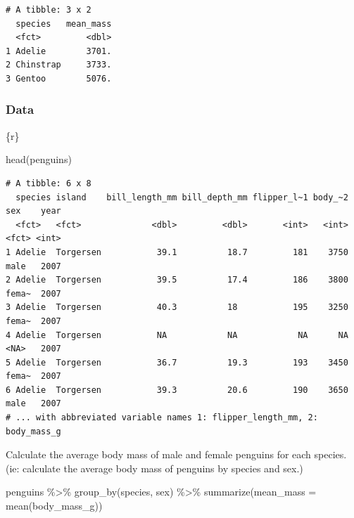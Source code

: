 \documentclass[
  letterpaper,
  DIV=11,
  numbers=noendperiod]{scrreprt}
\newenvironment{Shaded}{\begin{snugshade}}{\end{snugshade}}
\newcommand{\AttributeTok}[1]{\textcolor[rgb]{0.40,0.45,0.13}{#1}}
\newcommand{\FunctionTok}[1]{\textcolor[rgb]{0.28,0.35,0.67}{#1}}
\newcommand{\InformationTok}[1]{\textcolor[rgb]{0.37,0.37,0.37}{#1}}
\newcommand{\NormalTok}[1]{\textcolor[rgb]{0.00,0.23,0.31}{#1}}
\newcommand{\SpecialCharTok}[1]{\textcolor[rgb]{0.37,0.37,0.37}{#1}}
\begin{document}
\begin{verbatim}
# A tibble: 3 x 2
  species   mean_mass
  <fct>         <dbl>
1 Adelie        3701.
2 Chinstrap     3733.
3 Gentoo        5076.
\end{verbatim}

\hypertarget{data-5}{%
\subsubsection*{Data}\label{data-5}}

\begin{Shaded}
\begin{Highlighting}[]
\InformationTok{\textasciigrave{}\textasciigrave{}\textasciigrave{}\{r\}}

\FunctionTok{head}\NormalTok{(penguins)}
\InformationTok{\textasciigrave{}\textasciigrave{}\textasciigrave{}}
\end{Highlighting}
\end{Shaded}

\begin{verbatim}
# A tibble: 6 x 8
  species island    bill_length_mm bill_depth_mm flipper_l~1 body_~2 sex    year
  <fct>   <fct>              <dbl>         <dbl>       <int>   <int> <fct> <int>
1 Adelie  Torgersen           39.1          18.7         181    3750 male   2007
2 Adelie  Torgersen           39.5          17.4         186    3800 fema~  2007
3 Adelie  Torgersen           40.3          18           195    3250 fema~  2007
4 Adelie  Torgersen           NA            NA            NA      NA <NA>   2007
5 Adelie  Torgersen           36.7          19.3         193    3450 fema~  2007
6 Adelie  Torgersen           39.3          20.6         190    3650 male   2007
# ... with abbreviated variable names 1: flipper_length_mm, 2: body_mass_g
\end{verbatim}

Calculate the average body mass of male and female penguins for each
species. (ie: calculate the average body mass of penguins by species and
sex.)

\begin{Shaded}
\begin{Highlighting}[]
\NormalTok{penguins }\SpecialCharTok{\%\textgreater{}\%} 
  \FunctionTok{group\_by}\NormalTok{(species, sex) }\SpecialCharTok{\%\textgreater{}\%} 
  \FunctionTok{summarize}\NormalTok{(}\AttributeTok{mean\_mass =} \FunctionTok{mean}\NormalTok{(body\_mass\_g))}
\end{Highlighting}
\end{Shaded}
\end{document}
